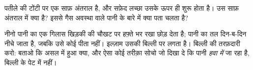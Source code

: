 \begin{exercise}[$\star\star$]\label{exo:g2:ice-water-steam:9}
पतीले की टोंटी पर एक साफ़ अंतराल है, और सफ़ेद लच्छा उसके ऊपर ही शुरू
होता है। उस साफ़ अंतराल में क्या है? इससे गैस अवस्था वाले पानी के
बारे में क्या पता चलता है?
\end{exercise}

\begin{exercise}[$\star\star$]\label{exo:g2:ice-water-steam:10}
नीनो पानी का एक गिलास खिड़की की चौखट पर हफ़्ते भर रखा छोड़ देता है;
पानी का तल दिन-ब-दिन नीचे जाता है, जबकि उसे कोई पीता नहीं। इल्ज़ाम
उसकी बिल्ली पर लगता है। बिल्ली की तरफ़दारी करो: बताओ कि असल में हुआ
क्या, और ऐसा कोई तरीक़ा सोचो जो दिखा दे कि पानी \emph{हवा में} जा
रहा है, बिल्ली के पेट में नहीं।
\end{exercise}
